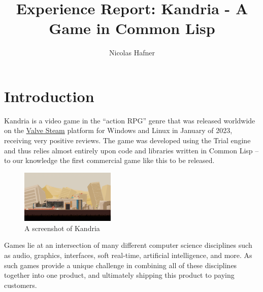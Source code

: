 \documentclass[format=sigconf]{acmart}
\begin{document}
\title{Experience Report: Kandria - A Game in Common Lisp}

\author{Nicolas Hafner}

\begin{abstract}
  
\end{abstract}

\begin{CCSXML}
  
\end{CCSXML}


\maketitle

\def\abovecaptionskip{1pt}
\def\listingautorefname{Listing}
\def\figureautorefname{Figure}

\section{Introduction}\label{introduction}
Kandria is a video game in the ``action RPG'' genre that was released worldwide on the \href{https://kandria.com/steam}{Valve Steam} platform for Windows and Linux in January of 2023, receiving very positive reviews. The game was developed using the Trial engine and thus relies almost entirely upon code and libraries written in Common Lisp -- to our knowledge the first commercial game like this to be released.

\begin{figure}[h]
  \begin{centering}
    \includegraphics[width=0.4\textwidth]{screenshot 8.png}
  \end{centering}
  \caption{A screenshot of Kandria}
\end{figure}

Games lie at an intersection of many different computer science disciplines such as audio, graphics, interfaces, soft real-time, artificial intelligence, and more. As such games provide a unique challenge in combining all of these disciplines together into one product, and ultimately shipping this product to paying customers.
\end{document}
